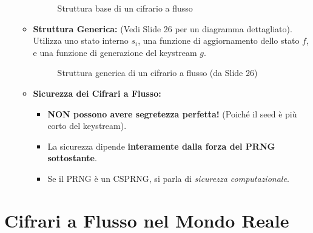 \begin{itemize}
\begin{itemize}
\begin{figure}[H]
            \caption{Struttura base di un cifrario a flusso}
        \end{figure}
        \item \textbf{Struttura Generica:} (Vedi Slide 26 per un diagramma dettagliato). Utilizza uno stato interno $s_i$, una funzione di aggiornamento dello stato $f$, e una funzione di generazione del keystream $g$.
        \begin{figure}[H]
            \centering
            \caption{Struttura generica di un cifrario a flusso (da Slide 26)}
        \end{figure}
        \item \textbf{Sicurezza dei Cifrari a Flusso:}
        \begin{itemize}
            \item \textbf{NON possono avere segretezza perfetta!} (Poiché il seed è più corto del keystream).
            \item La sicurezza dipende \textbf{interamente dalla forza del PRNG sottostante}.
            \item Se il PRNG è un CSPRNG, si parla di \textit{sicurezza computazionale}.
        \end{itemize}
    \end{itemize}
\end{itemize}

\section{Cifrari a Flusso nel Mondo Reale}
